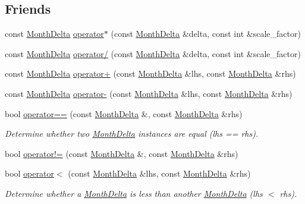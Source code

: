 \subsection*{Friends}
\begin{DoxyCompactItemize}
\item 
const \hyperlink{structMonthDelta}{Month\-Delta} \hyperlink{structMonthDelta_a371fb6abbbaa0d2c2011d29af10171bc}{operator$\ast$} (const \hyperlink{structMonthDelta}{Month\-Delta} \&delta, const int \&scale\-\_\-factor)
\item 
const \hyperlink{structMonthDelta}{Month\-Delta} \hyperlink{structMonthDelta_abd091fddaf6d6459ff88179670c45dda}{operator/} (const \hyperlink{structMonthDelta}{Month\-Delta} \&delta, const int \&scale\-\_\-factor)
\item 
const \hyperlink{structMonthDelta}{Month\-Delta} \hyperlink{structMonthDelta_a9f7f420c48017d9fecdcebc1864fdcad}{operator+} (const \hyperlink{structMonthDelta}{Month\-Delta} \&lhs, const \hyperlink{structMonthDelta}{Month\-Delta} \&rhs)
\item 
const \hyperlink{structMonthDelta}{Month\-Delta} \hyperlink{structMonthDelta_aee1cce9ecf1c7d81fb306bf791cc22f1}{operator-\/} (const \hyperlink{structMonthDelta}{Month\-Delta} \&lhs, const \hyperlink{structMonthDelta}{Month\-Delta} \&rhs)
\item 
bool \hyperlink{structMonthDelta_a9edf8fc83e1d85f6973698f907671f2d}{operator==} (const \hyperlink{structMonthDelta}{Month\-Delta} \&, const \hyperlink{structMonthDelta}{Month\-Delta} \&rhs)
\begin{DoxyCompactList}\small\item\em Determine whether two \hyperlink{structMonthDelta}{Month\-Delta} instances are equal (lhs == rhs). \end{DoxyCompactList}\item 
bool \hyperlink{structMonthDelta_a4af85af4ca025c7850dc65b9ec909c67}{operator!=} (const \hyperlink{structMonthDelta}{Month\-Delta} \&, const \hyperlink{structMonthDelta}{Month\-Delta} \&rhs)
\item 
bool \hyperlink{structMonthDelta_a6f3a37e7ae7d150527288eb9bca5ba32}{operator$<$} (const \hyperlink{structMonthDelta}{Month\-Delta} \&lhs, const \hyperlink{structMonthDelta}{Month\-Delta} \&rhs)
\begin{DoxyCompactList}\small\item\em Determine whether a \hyperlink{structMonthDelta}{Month\-Delta} is less than another \hyperlink{structMonthDelta}{Month\-Delta} (lhs $<$ rhs). \end{DoxyCompactList}\item 

\end{DoxyCompactItemize}
